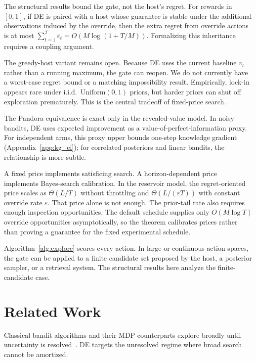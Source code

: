 \documentclass{article}
\begin{document}
The structural results bound the gate, not the host's regret.
For rewards in $[0,1]$, if DE is paired with a host whose guarantee is stable under the additional observations induced by the override, then the extra regret from override actions is at most $\sum_{t=1}^T\varepsilon_t=O(M\log(1+T/M))$.
Formalizing this inheritance requires a coupling argument.

The greedy-host variant remains open.
Because DE uses the current baseline $v_t$ rather than a running maximum, the gate can reopen.
We do not currently have a worst-case regret bound or a matching impossibility result.
Empirically, lock-in appears rare under i.i.d.\ $\mathrm{Uniform}(0,1)$ priors, but harder priors can shut off exploration prematurely.
This is the central tradeoff of fixed-price search.

The Pandora equivalence is exact only in the revealed-value model.
In noisy bandits, DE uses expected improvement as a value-of-perfect-information proxy.
For independent arms, this proxy upper bounds one-step knowledge gradient (Appendix~\ref{app:kg_ei}); for correlated posteriors and linear bandits, the relationship is more subtle.

A fixed price implements satisficing search.
A horizon-dependent price implements Bayes-search calibration.
In the reservoir model, the regret-oriented price scales as $\Theta(L/T)$ without throttling and $\Theta(L/(\varepsilon T))$ with constant override rate $\varepsilon$.
That price alone is not enough.
The prior-tail rate also requires enough inspection opportunities.
The default schedule supplies only $O(M\log T)$ override opportunities asymptotically, so the theorem calibrates prices rather than proving a guarantee for the fixed experimental schedule.

Algorithm~\ref{alg:explore} scores every action.
In large or continuous action spaces, the gate can be applied to a finite candidate set proposed by the host, a posterior sampler, or a retrieval system.
The structural results here analyze the finite-candidate case.

\section{Related Work}
\label{sec:related}

Classical bandit algorithms and their MDP counterparts explore broadly until uncertainty is resolved~\citep{auer2002finite,thompson1933likelihood,agrawal2012analysis,russo2014ids,jaksch2010near,strens2000bayesian,osband2013more}.
DE targets the unresolved regime where broad search cannot be amortized.
\end{document}
